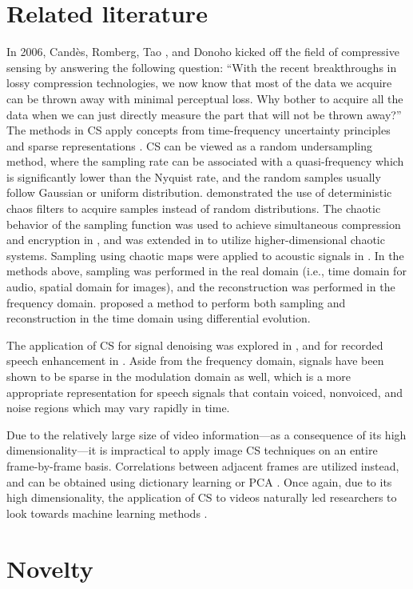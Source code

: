 \section{Related literature}
\label{sec:rrl}
In 2006, Cand\`{e}s, Romberg, Tao \cite{Candes2006}, and Donoho \cite{Donoho2006} kicked off the field of compressive sensing by answering the following question: ``With the recent breakthroughs in lossy compression technologies, we now know that most of the data we acquire can be thrown away with minimal perceptual loss. Why bother to acquire all the data when we can just directly measure the part that will not be thrown away?'' The methods in CS apply concepts from time-frequency uncertainty principles \cite{Donoho2001} and sparse representations \cite{Donoho2003}. CS can be viewed as a random undersampling method, where the sampling rate can be associated with a quasi-frequency which is significantly lower than the Nyquist rate, and the random samples usually follow Gaussian or uniform distribution. \cite{LinhTrung2008} demonstrated the use of deterministic chaos filters to acquire samples instead of random distributions. The chaotic behavior of the sampling function was used to achieve simultaneous compression and encryption in \cite{Mo2013}, and was extended in \cite{Zhou2016} to utilize higher-dimensional chaotic systems. Sampling using chaotic maps were applied to acoustic signals in \cite{Mathew2016}. In the methods above, sampling was performed in the real domain (i.e., time domain for audio, spatial domain for images), and the reconstruction was performed in the frequency domain. \cite{Andras2018} proposed a method to perform both sampling and reconstruction in the time domain using differential evolution.

The application of CS for signal denoising was explored in \cite{Dabov2007}, and for recorded speech enhancement in \cite{Low2013}. Aside from the frequency domain, signals have been shown to be sparse in the modulation domain as well, which is a more appropriate representation for speech signals \cite{Low2018} that contain voiced, nonvoiced, and noise regions which may vary rapidly in time.

Due to the relatively large size of video information---as a consequence of its high dimensionality---it is impractical to apply image CS techniques on an entire frame-by-frame basis. Correlations between adjacent frames are utilized instead, and can be obtained using dictionary learning \cite{Liu2013} or PCA \cite{Liu2014}. Once again, due to its high dimensionality, the application of CS to videos naturally led researchers to look towards machine learning methods \cite{Iliadis2018,Yao2019}.


\section{Novelty}
\label{sec:novel}